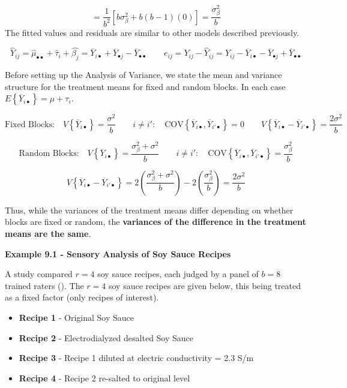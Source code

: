 \documentclass[
]{book}
\providecommand{\tightlist}{%
  \setlength{\itemsep}{0pt}\setlength{\parskip}{0pt}}
\begin{document}
\[=\frac{1}{b^2}\left[b\sigma_{\beta}^2+b(b-1)(0)\right]=
\frac{\sigma_{\beta}^2}{b}
\] The fitted values and residuals are similar to other models described
previously.

\[
\hat{Y}_{ij} = \hat{\mu}_{\bullet\bullet} + \hat{\tau}_i + \hat{\beta_j}
= \overline{Y}_{i\bullet} + \overline{Y}_{\bullet j} - \overline{Y}_{\bullet\bullet}
\qquad  e_{ij} = Y_{ij}-\hat{Y}_{ij} =
Y_{ij}-\overline{Y}_{i\bullet} - \overline{Y}_{\bullet j} + \overline{Y}_{\bullet\bullet}
\]

Before setting up the Analysis of Variance, we state the mean and
variance structure for the treatment means for fixed and random blocks.
In each case \(E\left\{\overline{Y}_{i\bullet}\right\} = \mu+\tau_i\).

\[
\mbox{Fixed Blocks:} \quad 
V\left\{\overline{Y}_{i\bullet}\right\}=\frac{\sigma^2}{b} \qquad 
i\ne i': \quad 
\mbox{COV}\left\{\overline{Y}_{i\bullet},\overline{Y}_{i'\bullet}\right\}=0 \qquad
V\left\{\overline{Y}_{i\bullet}-\overline{Y}_{i'\bullet}\right\}=\frac{2\sigma^2}{b}
\]

\[
\mbox{Random Blocks:} \quad 
V\left\{\overline{Y}_{i\bullet}\right\}=\frac{\sigma_{\beta}^2+\sigma^2}{b} \qquad
i\ne i': \quad
\mbox{COV}\left\{\overline{Y}_{i\bullet},\overline{Y}_{i'\bullet}\right\}=
\frac{\sigma_{\beta}^2}{b}\]

\[
V\left\{\overline{Y}_{i\bullet}-\overline{Y}_{i'\bullet}\right\}=
2\left(\frac{\sigma_{\beta}^2+\sigma^2}{b}\right)-2\left(\frac{\sigma_{\beta}^2}{b}\right)=
\frac{2\sigma^2}{b}
\]

Thus, while the variances of the treatment means differ depending on
whether blocks are fixed or random, the \textbf{variances of the
difference in the treatment means are the same}.

\textbf{Example 9.1 - Sensory Analysis of Soy Sauce Recipes}

A study compared \(r=4\) soy sauce recipes, each judged by a panel of
\(b=8\) trained raters (). The \(r=4\) soy sauce recipes are given below, this being
treated as a fixed factor (only recipes of interest).

\begin{itemize}
\tightlist
\item
  \textbf{Recipe 1} - Original Soy Sauce
\item
  \textbf{Recipe 2} - Electrodialyzed desalted Soy Sauce
\item
  \textbf{Recipe 3} - Recipe 1 diluted at electric conductivity = 2.3
  S/m
\item
  \textbf{Recipe 4} - Recipe 2 re-salted to original level
\end{itemize}
\end{document}

